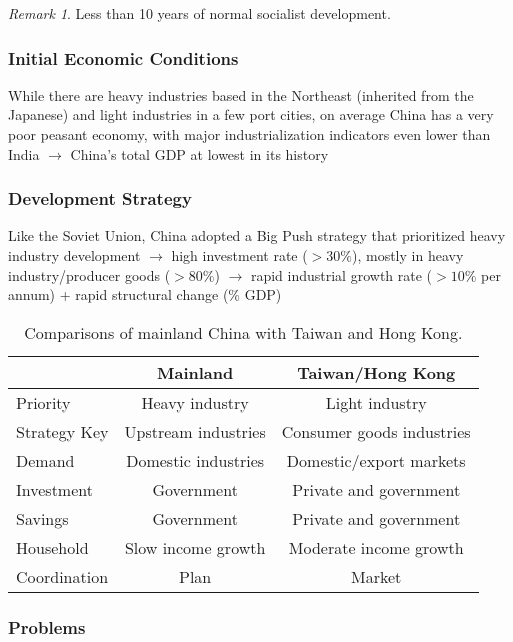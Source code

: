 \documentclass[11pt]{article}
\theoremstyle{definition}
\theoremstyle{remark}
\newtheorem*{remark}{Remark}
\begin{document}
\begin{remark}
Less than 10 years of normal socialist development.
\end{remark}

\subsubsection{Initial Economic Conditions}
While there are heavy industries based in the Northeast (inherited from the Japanese) and light industries in a few port cities, on average China has a very poor peasant economy, with major industrialization indicators even lower than India $\to$ China's total GDP at lowest in its history

\subsubsection{Development Strategy}
Like the Soviet Union, China adopted a Big Push strategy that prioritized heavy industry development $\to$ high investment rate ($> 30\%$), mostly in heavy industry/producer goods ($> 80\%$) $\to$ rapid industrial growth rate ($>10\%$ per annum) + rapid structural change (\% GDP)

\begin{table}[ht]
\centering
\caption{Comparisons of mainland China with Taiwan and Hong Kong.}
\begin{tabular}[t]{lcc}
\toprule
&Mainland&Taiwan/Hong Kong\\
\midrule
Priority&Heavy industry&Light industry\\
Strategy Key&Upstream industries&Consumer goods industries\\
Demand&Domestic industries&Domestic/export markets\\
Investment&Government&Private and government\\
Savings&Government&Private and government\\
Household&Slow income growth&Moderate income growth\\
Coordination&Plan&Market\\
\bottomrule
\end{tabular}
\end{table}%

\subsubsection{Problems}
\end{document}
